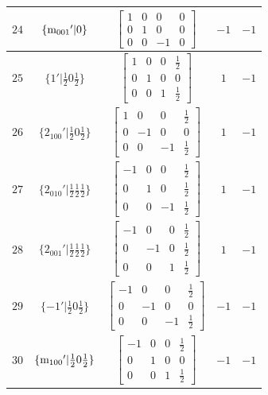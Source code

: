 \documentclass[fleqn,8pt]{jsarticle}
\begin{document}
\begin{longtable}{ccccc}
$ 24 $ & $ \{{\rm m}_{001}{}'|0\} $ & $ \begin{bmatrix} 1 & 0 & 0 & 0 \\ 0 & 1 & 0 & 0 \\ 0 & 0 & -1 & 0 \end{bmatrix} $ & $ -1 $ & $ -1 $ \\ \hline
$ 25 $ & $ \{1{}'|\frac{1}{2} 0 \frac{1}{2}\} $ & $ \begin{bmatrix} 1 & 0 & 0 & \frac{1}{2} \\ 0 & 1 & 0 & 0 \\ 0 & 0 & 1 & \frac{1}{2} \end{bmatrix} $ & $ 1 $ & $ -1 $ \\ \hline
$ 26 $ & $ \{2{}_{100}{}'|\frac{1}{2} 0 \frac{1}{2}\} $ & $ \begin{bmatrix} 1 & 0 & 0 & \frac{1}{2} \\ 0 & -1 & 0 & 0 \\ 0 & 0 & -1 & \frac{1}{2} \end{bmatrix} $ & $ 1 $ & $ -1 $ \\ \hline
$ 27 $ & $ \{2{}_{010}{}'|\frac{1}{2} \frac{1}{2} \frac{1}{2}\} $ & $ \begin{bmatrix} -1 & 0 & 0 & \frac{1}{2} \\ 0 & 1 & 0 & \frac{1}{2} \\ 0 & 0 & -1 & \frac{1}{2} \end{bmatrix} $ & $ 1 $ & $ -1 $ \\ \hline
$ 28 $ & $ \{2{}_{001}{}'|\frac{1}{2} \frac{1}{2} \frac{1}{2}\} $ & $ \begin{bmatrix} -1 & 0 & 0 & \frac{1}{2} \\ 0 & -1 & 0 & \frac{1}{2} \\ 0 & 0 & 1 & \frac{1}{2} \end{bmatrix} $ & $ 1 $ & $ -1 $ \\ \hline
$ 29 $ & $ \{-1{}'|\frac{1}{2} 0 \frac{1}{2}\} $ & $ \begin{bmatrix} -1 & 0 & 0 & \frac{1}{2} \\ 0 & -1 & 0 & 0 \\ 0 & 0 & -1 & \frac{1}{2} \end{bmatrix} $ & $ -1 $ & $ -1 $ \\ \hline
$ 30 $ & $ \{{\rm m}_{100}{}'|\frac{1}{2} 0 \frac{1}{2}\} $ & $ \begin{bmatrix} -1 & 0 & 0 & \frac{1}{2} \\ 0 & 1 & 0 & 0 \\ 0 & 0 & 1 & \frac{1}{2} \end{bmatrix} $ & $ -1 $ & $ -1 $ \\ \hline

\end{longtable}
\end{document}
